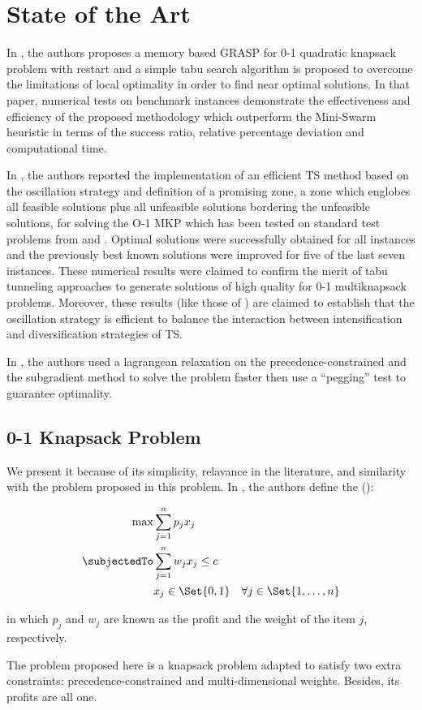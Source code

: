 \section{State of the Art}

In \cite{bib:grasp-and-tabu}, the authors proposes a memory based GRASP for 0-1
quadratic knapsack problem with restart and a simple tabu search algorithm is proposed to overcome the limitations of local optimality in order to find near optimal solutions. In that paper, numerical tests on benchmark instances demonstrate the effectiveness and efficiency of the proposed methodology which outperform the Mini-Swarm heuristic in terms of the success ratio, relative percentage deviation and computational time.

In \cite{bib:tabu-knapsack}, the authors reported the implementation of an efficient TS method based on the oscillation strategy and definition of a promising zone, a zone which englobes all feasible solutions plus all unfeasible solutions bordering the unfeasible solutions, for solving the O-1 MKP which has been tested on standard test problems from \cite{bib:freville,bib:preprocessing-knapsack-1994} and \cite{bib:tabu-multidimensional-knapsack}. Optimal solutions were successfully obtained for all instances and the previously best known solutions were improved for five of the last seven instances. These numerical results were claimed to confirm the merit of tabu tunneling approaches to generate solutions of high quality for 0-1 multiknapsack problems. Moreover, these results (like those of \cite{bib:tabu-multidimensional-knapsack}) are claimed to establish that the oscillation strategy is efficient to balance the interaction between intensification and diversification strategies of TS.

In \cite{bib:constrained-knapsack}, the authors used a lagrangean relaxation on the precedence-constrained and the subgradient method to solve the problem faster then use a ``pegging'' test to guarantee optimality.


\subsection{0-1 Knapsack Problem}

We present it because of its simplicity, relavance in the literature, and similarity with the problem proposed in this problem. In \cite{bib:knapsack-problems}, the authors define the \zoKPV (\zoKP):

\begin{eqnarray}
    \label{problem:knapsack-problem}
    \max & \displaystyle\sum\limits_{j=1}^{n} p_j x_j \\
    \subjectedTo
        & \displaystyle\sum\limits_{j=1}^{n} w_j x_j \leq c \nonumber\\
        & x_j \in \Set{0, 1} \quad \forall j \in \Set{1, \dots, n} \nonumber
\end{eqnarray}

in which $p_j$ and $w_j$ are known as the profit and the weight of the item $j$, respectively.

The problem proposed here is a knapsack problem adapted to satisfy two extra constraints: precedence-constrained and multi-dimensional weights. Besides, its profits are all one.
